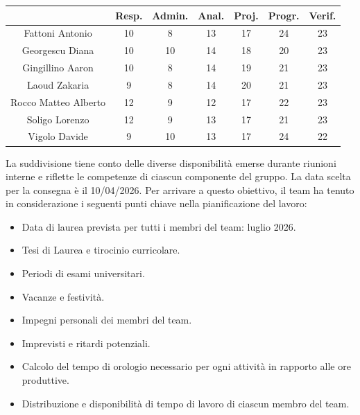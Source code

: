 \documentclass[a4paper,12pt]{article}
\begin{document}
\vspace{1cm}
\begin{table}[H]
{
\centering
\begin{tabular}{c|c|c|c|c|c|c}

        & \textbf{Resp.} & \textbf{Admin.} & \textbf{Anal.} & \textbf{Proj.} & \textbf{Progr.} & \textbf{Verif.} \\
        \hline
        Fattoni Antonio & 10 & 8 & 13 & 17 & 24 & 23\\
        \hline
        Georgescu Diana & 10 & 10 & 14 & 18 & 20 & 23\\
        \hline
        Gingillino Aaron & 10 & 8 & 14 & 19 & 21 & 23\\
        \hline
        Laoud Zakaria & 9 & 8 & 14 & 20 & 21 & 23\\
        \hline
        Rocco Matteo Alberto & 12 & 9 & 12 & 17 & 22 & 23\\
        \hline
        Soligo Lorenzo & 12 & 9 & 13 & 17 & 21 & 23\\
        \hline
        Vigolo Davide & 9 & 10 & 13 & 17 & 24 & 22\\
\end{tabular}\par
}
\end{table}

\noindent La suddivisione tiene conto delle diverse disponibilità emerse durante riunioni interne e riflette le competenze di ciascun componente del gruppo.
La data scelta per la consegna è il 10/04/2026.
Per arrivare a questo obiettivo, il team ha tenuto in considerazione i seguenti punti chiave nella pianificazione del lavoro:

\begin{itemize}
    \item Data di laurea prevista per tutti i membri del team: luglio 2026.
    \item Tesi di Laurea e tirocinio curricolare.
    \item Periodi di esami universitari.
    \item Vacanze e festività.
    \item Impegni personali dei membri del team.
    \item Imprevisti e ritardi potenziali.
    \item Calcolo del tempo di orologio necessario per ogni attività in rapporto alle ore produttive.
    \item Distribuzione e disponibilità di tempo di lavoro di ciascun membro del team.
\end{itemize}
\end{document}
